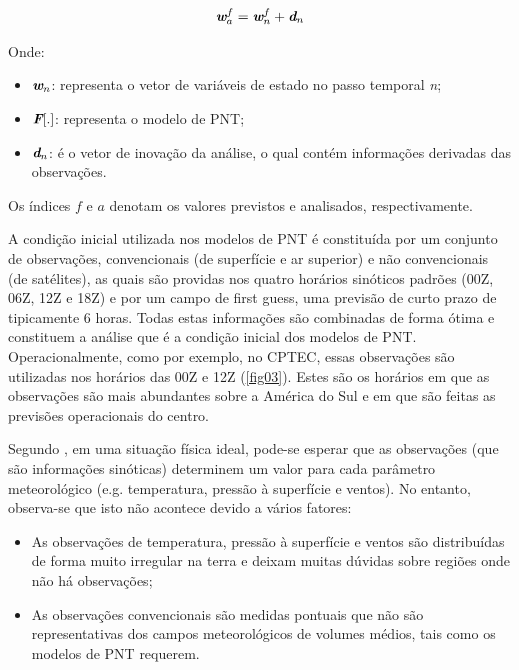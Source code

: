 \begin{equation}
\textit{\textbf{w}}^{f}_{a}=\textit{\textbf{w}}^{f}_{n}+\textit{\textbf{d}}_{n}
 \label{form05}
\end{equation}

Onde:

\begin{itemize}
\item $\textit{\textbf{w}}_{n}$: representa o vetor de variáveis de estado no passo temporal \textit{n};
\item $\textit{\textbf{F}}[.]$: representa o modelo de PNT;
\item $\textit{\textbf{d}}_{n}$: é o vetor de inovação da análise, o qual contém informações derivadas das observações.
\end{itemize}

Os índices $\textit{f}$ e $\textit{a}$ denotam os valores previstos e analisados, respectivamente.

A condição inicial utilizada nos modelos de PNT é constituída por um conjunto de observações, convencionais (de superfície e ar superior) e não convencionais (de satélites), as quais são providas nos quatro horários sinóticos padrões (00Z, 06Z, 12Z e 18Z) e por um campo de first guess, uma previsão de curto prazo de tipicamente 6 horas. Todas estas informações são combinadas de forma ótima e constituem a análise que é a condição inicial dos modelos de PNT. Operacionalmente, como por exemplo, no CPTEC, essas observações são utilizadas nos horários das 00Z e 12Z (\autoref{fig03}). Estes são os horários em que as observações são mais abundantes sobre a América do Sul e em que são feitas as previsões operacionais do centro.

Segundo \cite{morel1980}, em uma situação física ideal, pode-se esperar que as observações (que são informações sinóticas) determinem um valor para cada parâmetro meteorológico (e.g. temperatura, pressão à superfície e ventos). No entanto, observa-se que isto não acontece devido a vários fatores:

\begin{itemize}
\item As observações de temperatura, pressão à superfície e ventos são distribuídas de forma muito irregular na terra e deixam muitas dúvidas sobre regiões onde não há observações;
\item As observações convencionais são medidas pontuais que não são representativas dos campos meteorológicos de volumes médios, tais como os modelos de PNT requerem.
\end{itemize}

